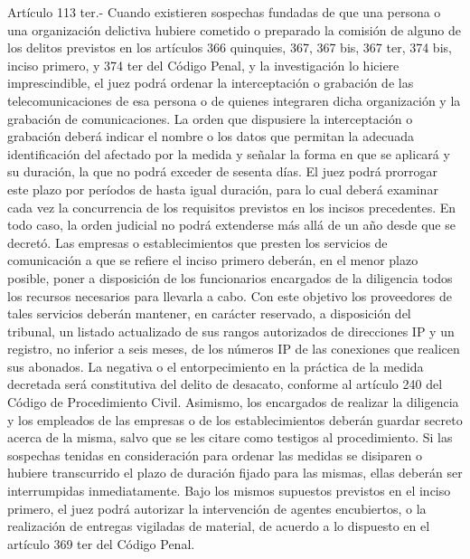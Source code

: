     Artículo 113 ter.- Cuando existieren sospechas fundadas de que una persona o una organización delictiva hubiere cometido o preparado la comisión de alguno de los delitos previstos en los artículos 366 quinquies, 367, 367 bis, 367 ter, 374 bis, inciso primero, y 374 ter del Código Penal, y la investigación lo hiciere imprescindible, el juez podrá ordenar la interceptación o grabación de las telecomunicaciones de esa persona o de quienes integraren dicha organización y la grabación de comunicaciones.
    La orden que dispusiere la interceptación o grabación deberá indicar el nombre o los datos que permitan la adecuada identificación del afectado por la medida y señalar la forma en que se aplicará y su duración, la que no podrá exceder de sesenta días. El juez podrá prorrogar este plazo por períodos de hasta igual duración, para lo cual deberá examinar cada vez la concurrencia de los requisitos previstos en los incisos precedentes. En todo caso, la orden judicial no podrá extenderse más allá de un año desde que se decretó.
    Las empresas o establecimientos que presten los servicios de comunicación a que se refiere el inciso primero deberán, en el menor plazo posible, poner a disposición de los funcionarios encargados de la diligencia todos los recursos necesarios para llevarla a cabo. Con este objetivo los proveedores de tales servicios deberán mantener, en carácter reservado, a disposición del tribunal, un listado actualizado de sus rangos autorizados de direcciones IP y un registro, no inferior a seis meses, de los números IP de las conexiones que realicen sus abonados. La negativa o el entorpecimiento en la práctica de la medida decretada será constitutiva del delito de desacato, conforme al artículo 240 del Código de Procedimiento Civil. Asimismo, los encargados de realizar la diligencia y los empleados de las empresas o de los establecimientos deberán guardar secreto acerca de la misma, salvo que se les citare como testigos al procedimiento.
    Si las sospechas tenidas en consideración para ordenar las medidas se disiparen o hubiere transcurrido el plazo de duración fijado para las mismas, ellas deberán ser interrumpidas inmediatamente.
    Bajo los mismos supuestos previstos en el inciso primero, el juez podrá autorizar la intervención de agentes encubiertos, o la realización de entregas vigiladas de material, de acuerdo a lo dispuesto en el artículo 369 ter del Código Penal.

